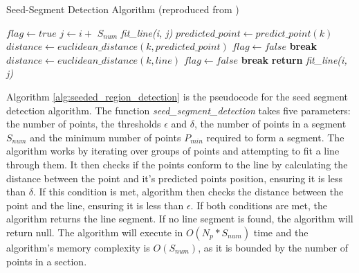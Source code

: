 \documentclass[12pt]{article}
\begin{document}
\begin{algorithm}[H]
    \caption{Seed-Segment Detection Algorithm (reproduced from \cite{seeded_region_growing})}\label{alg:seeded_region_detection}
    \begin{algorithmic}
            \State $flag \gets true$
                \State $j \gets i + $ $S_{num}$
                \State \textit{fit\_line(i, j)}
                    \State $predicted\_point \gets predict\_point(k)$
                    \State $distance \gets euclidean\_distance(k, predicted\_point)$
                        \State $flag \gets false$
                        \State \textbf{break}
                    \EndIf
                    \State $distance \gets euclidean\_distance(k, line)$
                        \State $flag \gets false$
                        \State \textbf{break}
                    \EndIf
                \EndFor
                    \State \textbf{return} \textit{fit\_line(i, j)}
                \EndIf
            \EndFor
        \EndFunction{}
    \end{algorithmic}
\end{algorithm}
Algorithm \ref{alg:seeded_region_detection} is the pseudocode for the seed segment detection algorithm. The function
\textit{seed\_segment\_detection} takes five parameters: the number of points, the thresholds $\epsilon$ and $\delta$, the
number of points in a segment $S_{num}$ and the minimum number of points $P_{min}$ required to form a segment. The algorithm
works by iterating over groups of points and attempting to fit a line through them. It then checks if the points conform to the
line by calculating the distance between the point and it's predicted points position, ensuring it is less than $\delta$. If this condition
is met, algorithm then checks the distance between the point and the line, ensuring it is less than $\epsilon$. If both conditions are
met, the algorithm returns the line segment. If no line segment is found, the algorithm will return null. The algorithm will execute in
\(O(N_p * S_{num})\) time and the algorithm's memory complexity is \(O(S_{num})\), as it is bounded by the number of points in a
section.\\
\end{document}
